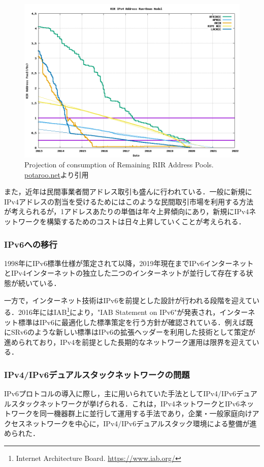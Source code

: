 \begin{figure}
	\centering
	\includegraphics[width=12cm]{img/plotend.png}
	\caption{Projection of consumption of Remaining RIR Address Pools. \url{potaroo.net}より引用\cite{potaroo_IPv4}}
	\label{fig:potaroo_IPv4}
\end{figure}
    
また，近年は民間事業者間アドレス取引も盛んに行われている．一般に新規にIPv4アドレスの割当を受けるためにはこのような民間取引市場を利用する方法が考えられるが，1アドレスあたりの単価は年々上昇傾向にあり\cite{howard2013internet}，新規にIPv4ネットワークを構築するためのコストは日々上昇していくことが考えられる．


\subsubsection{IPv6への移行}
\label{introduction:background:ipv6_transition}
1998年にIPv6標準仕様が策定されて以降\cite{RFC2460}，2019年現在までIPv6インターネットとIPv4インターネットの独立した二つのインターネットが並行して存在する状態が続いている．

一方で，インターネット技術はIPv6を前提とした設計が行われる段階を迎えている．2016年にはIAB\footnote{Internet Architecture Board. \url{https://www.iab.org/}}により，"IAB Statement on IPv6"が発表され，インターネット標準はIPv6に最適化した標準策定を行う方針が確認されている\cite{IAB_statement}．例えば既にSRv6のような新しい標準はIPv6の拡張ヘッダーを利用した技術として策定が進められており，IPv4を前提とした長期的なネットワーク運用は限界を迎えている．

\subsubsection{IPv4/IPv6デュアルスタックネットワークの問題}
\label{introduction:background:dualstack_problems}
IPv6プロトコルの導入に際し，主に用いられていた手法としてIPv4/IPv6デュアルスタックネットワークが挙げられる\cite{durand2001deploying}．これは，IPv4ネットワークとIPv6ネットワークを同一機器群上に並行して運用する手法であり，企業・一般家庭向けアクセスネットワークを中心に，IPv4/IPv6デュアルスタック環境による整備が進められた．

